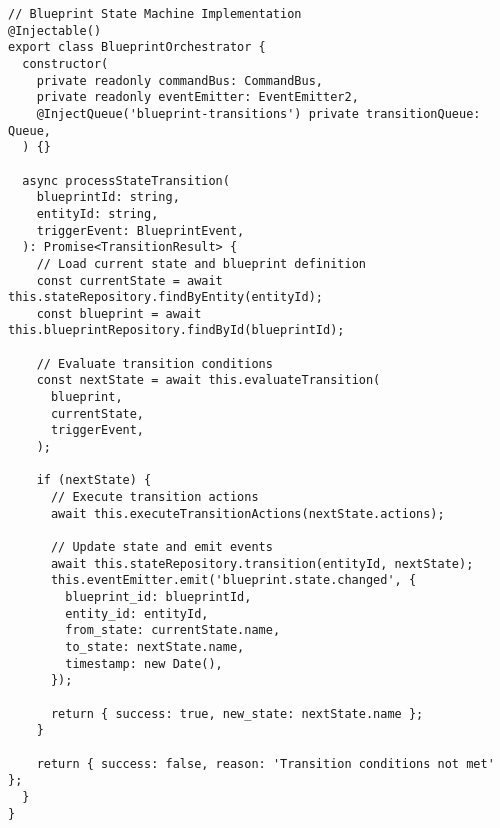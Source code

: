 \begin{verbatim}
// Blueprint State Machine Implementation
@Injectable()
export class BlueprintOrchestrator {
  constructor(
    private readonly commandBus: CommandBus,
    private readonly eventEmitter: EventEmitter2,
    @InjectQueue('blueprint-transitions') private transitionQueue: Queue,
  ) {}

  async processStateTransition(
    blueprintId: string,
    entityId: string,
    triggerEvent: BlueprintEvent,
  ): Promise<TransitionResult> {
    // Load current state and blueprint definition
    const currentState = await this.stateRepository.findByEntity(entityId);
    const blueprint = await this.blueprintRepository.findById(blueprintId);
    
    // Evaluate transition conditions
    const nextState = await this.evaluateTransition(
      blueprint,
      currentState,
      triggerEvent,
    );
    
    if (nextState) {
      // Execute transition actions
      await this.executeTransitionActions(nextState.actions);
      
      // Update state and emit events
      await this.stateRepository.transition(entityId, nextState);
      this.eventEmitter.emit('blueprint.state.changed', {
        blueprint_id: blueprintId,
        entity_id: entityId,
        from_state: currentState.name,
        to_state: nextState.name,
        timestamp: new Date(),
      });
      
      return { success: true, new_state: nextState.name };
    }
    
    return { success: false, reason: 'Transition conditions not met' };
  }
}
\end{verbatim} 